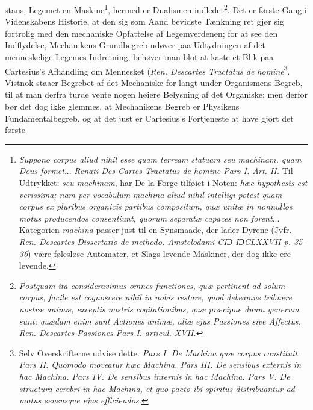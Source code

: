 \documentclass[12pt,a4paper]{book}
\begin{document}
\setcounter{footnote}{0}
stans, Legemet en Maskine\footnote{\textit{Suppono corpus aliud nihil esse quam
terream statuam seu machinam, quam Deus formet}... \textit{Renati Des-Cartes
Tractatus de homine Pars I. Art. II.} Til Udtrykket: \textit{seu machinam}, har
De la Forge tilføiet i Noten: \textit{hæc hypothesis est verissima; nam per
vocabulum} \emph{\textit{machina}} \textit{aliud nihil intelligi potest quam
corpus ex pluribus organicis partibus compositum, quæ unitæ in nonnullos motus
producendos consentiunt, quorum separatæ capaces non forent}... Kategorien
\textit{machina} passer just til en Synsmaade, der lader Dyrene (Jvfr.
\textit{Ren. Descartes Dissertatio de methodo. Amstelodami CIƆ IƆCLXXVII p.
35--36}) være følesløse Automater, et Slags levende Maskiner, der dog ikke ere
levende.}, hermed er Dualismen indledet\footnote{\textit{Postquam ita
consideravimus omnes functiones, quæ pertinent ad solum corpus, facile est
cognoscere nihil in nobis restare, quod debeamus tribuere nostræ animæ, exceptis
nostris cogitationibus, quæ præcipue duum generum sunt; quædam enim sunt Actiones
animæ, aliæ ejus Passiones sive Affectus. Ren. Descartes Passiones Pars I.
articul. XVII.}}. Det er første Gang i Videnskabens Historie, at den sig som Aand
bevidste Tænkning ret gjør sig fortrolig med den mechaniske Opfattelse af
Legemverdenen; for at see den Indflydelse, Mechanikens Grundbegreb udøver paa
Udtydningen af det menneskelige Legemes Indretning, behøver man blot at kaste et
Blik paa Cartesius's Afhandling om Mennesket (\textit{Ren. Descartes Tractatus de
homine}\footnote{Selv Overskrifterne udvise dette. \textit{Pars I. De Machina quæ
corpus constituit. Pars II. Quomodo moveatur hæc Machina. Pars III. De sensibus
externis in hac Machina. Pars IV. De sensibus internis in hac Machina. Pars V. De
structura cerebri in hac Machina, et quo pacto ibi spiritus distribuantur ad
motus sensusque ejus efficiendos.}}.
Vistnok staaer Begrebet af det Mechaniske for langt under Organismens Begreb, til
at man derfra turde vente nogen høiere Belysning af det Organiske; men derfor bør
det dog ikke glemmes, at Mechanikens Begreb er Physikens Fundamentalbegreb, og at
det just er Cartesius's Fortjeneste at have gjort det første
\end{document}

